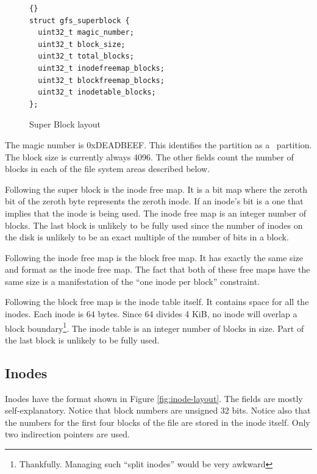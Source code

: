 \begin{figure}[htbp]
  \centering
  \begin{bigbox}
\begin{lstlisting}{}
struct gfs_superblock {
  uint32_t magic_number;
  uint32_t block_size;
  uint32_t total_blocks;
  uint32_t inodefreemap_blocks;
  uint32_t blockfreemap_blocks;
  uint32_t inodetable_blocks;
};
\end{lstlisting}
  \end{bigbox}
  \caption{Super Block layout}
  \label{fig:super-layout}
\end{figure}

The magic number is 0xDEADBEEF. This identifies the partition as a \GenericFS\ partition. The
block size is currently always 4096. The other fields count the number of blocks in each of the
file system areas described below.

Following the super block is the inode free map. It is a bit map where the zeroth bit of the
zeroth byte represents the zeroth inode. If an inode's bit is a one that implies that the inode
is being used. The inode free map is an integer number of blocks. The last block is unlikely to
be fully used since the number of inodes on the disk is unlikely to be an exact multiple of the
number of bits in a block.

Following the inode free map is the block free map. It has exactly the same size and format as
the inode free map. The fact that both of these free maps have the same size is a manifestation
of the ``one inode per block'' constraint.

Following the block free map is the inode table itself. It contains space for all the inodes.
Each inode is 64 bytes. Since 64 divides 4 KiB, no inode will overlap a block
boundary\footnote{Thankfully. Managing such ``split inodes'' would be very awkward}. The inode
table is an integer number of blocks in size. Part of the last block is unlikely to be fully
used.

\subsection{Inodes}
\label{sec:structure-inode}

Inodes have the format shown in Figure \ref{fig:inode-layout}. The fields are mostly
self-explanatory. Notice that block numbers are unsigned 32 bits. Notice also that the numbers
for the first four blocks of the file are stored in the inode itself. Only two indirection
pointers are used.

